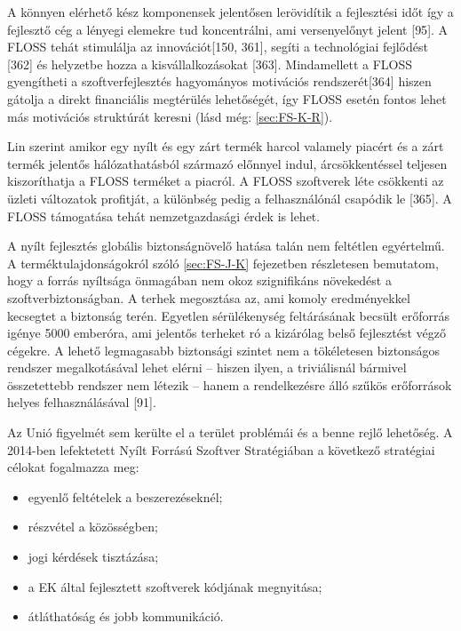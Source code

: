 \documentclass[12pt,magyar,a4paper,oneside]{scrreprt}
\providecommand{\tightlist}{%
  \setlength{\itemsep}{0pt}\setlength{\parskip}{0pt}}
\begin{document}
A könnyen elérhető kész komponensek jelentősen lerövidítik a fejlesztési
időt így a fejlesztő cég a lényegi elemekre tud koncentrálni, ami
versenyelőnyt jelent {[}95{]}. A FLOSS tehát stimulálja az
innovációt{[}150, 361{]}, segíti a technológiai fejlődést {[}362{]} és
helyzetbe hozza a kisvállalkozásokat {[}363{]}. Mindamellett a FLOSS
gyengítheti a szoftverfejlesztés hagyományos motivációs
rendszerét{[}364{]} hiszen gátolja a direkt financiális megtérülés
lehetőségét, így FLOSS esetén fontos lehet más motivációs struktúrát
keresni (lásd még: \ref{sec:FS-K-R}).

Lin szerint amikor egy nyílt és egy zárt termék harcol valamely piacért
és a zárt termék jelentős hálózathatásból származó előnnyel indul,
árcsökkentéssel teljesen kiszoríthatja a FLOSS terméket a piacról. A
FLOSS szoftverek léte csökkenti az üzleti változatok profitját, a
különbség pedig a felhasználónál csapódik le {[}365{]}. A FLOSS
támogatása tehát nemzetgazdasági érdek is lehet.

A nyílt fejlesztés globális biztonságnövelő hatása talán nem feltétlen
egyértelmű. A terméktulajdonságokról szóló \ref{sec:FS-J-K} fejezetben
részletesen bemutatom, hogy a forrás nyíltsága önmagában nem okoz
szignifikáns növekedést a szoftverbiztonságban. A terhek megosztása az,
ami komoly eredményekkel kecsegtet a biztonság terén. Egyetlen
sérülékenység feltárásának becsült erőforrás igénye 5000 emberóra, ami
jelentős terheket ró a kizárólag belső fejlesztést végző cégekre. A
lehető legmagasabb biztonsági szintet nem a tökéletesen biztonságos
rendszer megalkotásával lehet elérni -- hiszen ilyen, a triviálisnál
bármivel összetettebb rendszer nem létezik -- hanem a rendelkezésre álló
szűkös erőforrások helyes felhasználásával {[}91{]}.

Az Unió figyelmét sem kerülte el a terület problémái és a benne rejlő
lehetőség. A 2014-ben lefektetett Nyílt Forrású Szoftver Stratégiában a
következő stratégiai célokat fogalmazza meg:

\begin{itemize}
\tightlist
\item
  egyenlő feltételek a beszerezéseknél;
\item
  részvétel a közösségben;
\item
  jogi kérdések tisztázása;
\item
  a EK által fejlesztett szoftverek kódjának megnyitása;
\item
  átláthatóság és jobb kommunikáció.
\end{itemize}
\end{document}
